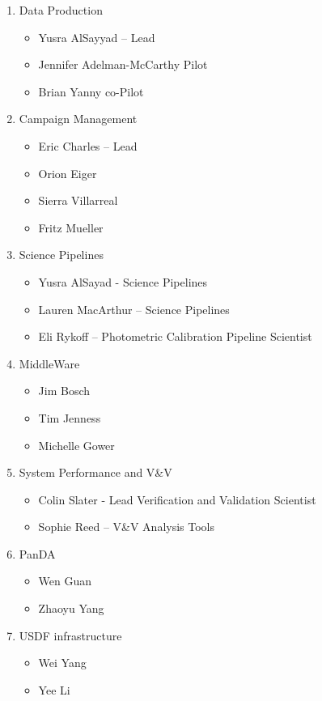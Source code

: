 \begin{enumerate}

\item Data Production

\begin{itemize}
\item Yusra AlSayyad -- Lead
\item Jennifer Adelman-McCarthy Pilot
\item Brian Yanny co-Pilot
\end{itemize}

\item Campaign Management

\begin{itemize}
\item Eric Charles -- Lead
\item Orion Eiger
\item Sierra Villarreal
\item Fritz Mueller
\end{itemize}

\item Science Pipelines

\begin{itemize}
\item Yusra AlSayad - Science Pipelines 
\item Lauren MacArthur -- Science Pipelines
\item Eli Rykoff -- Photometric Calibration Pipeline Scientist
\end{itemize}

\item MiddleWare
\begin{itemize}
\item Jim Bosch
\item Tim Jenness
\item Michelle Gower
\end{itemize}

\item System Performance and V\&V

\begin{itemize}
\item Colin Slater - Lead Verification and Validation Scientist
\item Sophie Reed -- V\&V Analysis Tools
\end{itemize}

\item PanDA
\begin{itemize}
\item Wen Guan
\item Zhaoyu Yang
\end{itemize}

\item USDF infrastructure
\begin{itemize}
\item Wei Yang
\item Yee Li
\end{itemize}

\end{enumerate}

